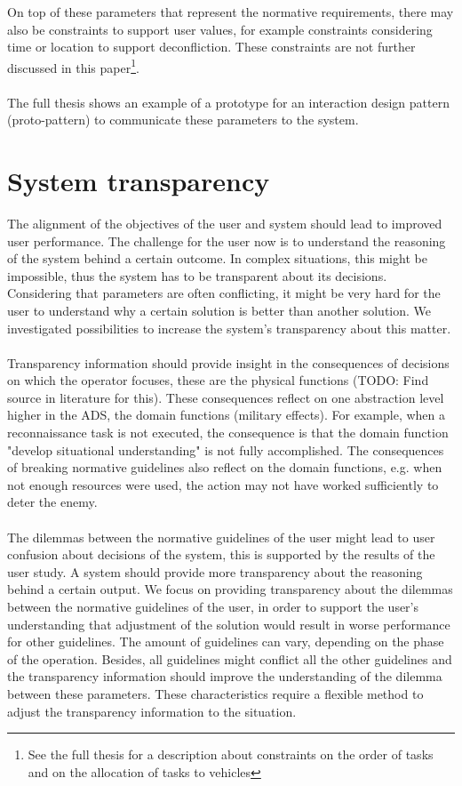 \documentclass[twoside,twocolumn]{article}
\begin{document}
%
On top of these parameters that represent the normative requirements, there may also be constraints to support user values, for example constraints considering time or location to support deconfliction. These constraints are not further discussed in this paper\footnote{See the full thesis for a description about constraints on the order of tasks and on the allocation of tasks to vehicles}.
\\\\
The full thesis shows an example of a prototype for an interaction design pattern (proto-pattern) to communicate these parameters to the system. 


\section{System transparency}\label{sec:transparency}
The alignment of the objectives of the user and system should lead to improved user performance. The challenge for the user now is to understand the reasoning of the system behind a certain outcome. In complex situations, this might be impossible, thus the system has to be transparent about its decisions. Considering that parameters are often conflicting, it might be very hard for the user to understand why a certain solution is better than another solution. We investigated possibilities to increase the system's transparency about this matter. 
\\\\
Transparency information should provide insight in the consequences of decisions on which the operator focuses, these are the physical functions (TODO: Find source in literature for this). These consequences reflect on one abstraction level higher in the ADS, the domain functions (military effects). For example, when a reconnaissance task is not executed, the consequence is that the domain function "develop situational understanding" is not fully accomplished. The consequences of breaking normative guidelines also reflect on the domain functions, e.g. when not enough resources were used, the action may not have worked sufficiently to deter the enemy. 
\\\\
The dilemmas between the normative guidelines of the user might lead to user confusion about decisions of the system, this is supported by the results of the user study. A system should provide more transparency about the reasoning behind a certain output. We focus on providing transparency about the dilemmas between the normative guidelines of the user, in order to support the user's understanding that adjustment of the solution would result in worse performance for other guidelines. The amount of guidelines can vary, depending on the phase of the operation. Besides, all guidelines might conflict all the other guidelines and the transparency information should improve the understanding of the dilemma between these parameters. These characteristics require a flexible method to adjust the transparency information to the situation. 
\end{document}
